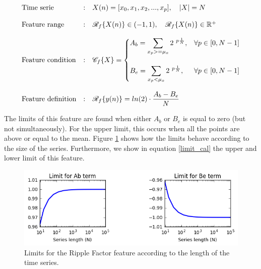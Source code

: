 \begin{equation}
\begin{array}{lcl}
\text{Time serie}			&:& X(n) = [x_0, x_1, x_2, ..., x_p], \quad |X| = N \\ \\
\text{Feature range} 		&:& \mathscr{R}_f \{ {X(n)}\} \in (-1, 1), \quad 
								\mathscr{R}_f \{ {X(n)}\} \in \mathbb{R}^+ \\ \\
\text{Feature condition}	&:& \mathscr{C}_f \{ {X}\} = \begin{cases}  
				A_b = \mathlarger{\sum_{x_p >= \mu_x} 2^{\ p \frac{1}{N}}}, & \forall p \in [0,N-1] \\ \\  											B_e = \mathlarger{\sum_{x_p < \mu_x} 2^{\ p  \frac{1}{N}}}, & \forall p \in [0,N-1] 			
							\end{cases} \\ \\
\text{Feature definition}	&:& \mathscr{R}_f \{ {y(n)}\} = ln(2) \cdot \dfrac{A_b - B_e }{N}  							
\end{array}
\label{ripple_factor}
\end{equation}

The limits of this feature are found when either $A_b$ or $B_e$ is equal to zero (but not simultaneously). For the upper limit, this occurs when all the points are above or equal to the mean. Figure \ref{fig:ripple_limits} shows how the limits behave according to the size of the series. Furthermore, we show in equation \ref{limit_cal} the upper and lower limit of this feature.

\begin{figure}[h!]
  \vspace{0.5em} %
  \includegraphics[scale=0.8]{Figures/limits_ripple_feature.jpg}
  \caption{Limits for the Ripple Factor feature according to the length of the time series.}
  \label{fig:ripple_limits}
\end{figure}



